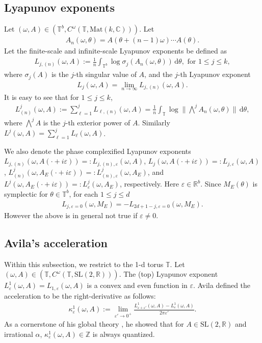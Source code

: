 \documentclass[11pt]{amsart}
\newcommand{\Z}{\mathbb Z}
\newcommand{\R}{\mathbb R}
\newcommand{\C}{\mathbb C}
\newcommand{\T}{\mathbb T}
\begin{document}
\subsection{Lyapunov exponents}
Let $(\omega, A)\in (\T^b, C^{\omega}(\T, \mathrm{Mat}(k,\C)))$. 
Let 
\begin{align}
A_n(\omega,\theta)=A(\theta+(n-1)\omega)\cdots A(\theta).
\end{align}
Let the finite-scale and infinite-scale Lyapunov exponents be defined as 
\begin{align}\label{def:LE}
L_{j,(n)}(\omega, A):=\frac{1}{n}\int_{\T^b} \log \sigma_j(A_n(\omega,\theta))\, \mathrm{d}\theta, \text{ for } 1\leq j\leq k,
\end{align}
where $\sigma_j(A)$ is the $j$-th singular value of $A$, and the $j$-th Lyapunov exponent
\begin{align}
L_j(\omega, A)=\lim_{n\to\infty}L_{j,(n)}(\omega, A).
\end{align}
It is easy to see that for $1\leq j\leq k$,
\begin{align}
L^j_{(n)}(\omega, A):=\sum_{\ell=1}^j L_{\ell,(n)}(\omega, A)=\frac{1}{n}\int_{\T}\log \|\textstyle{\bigwedge^j} A_n(\omega,\theta)\|\, \mathrm{d}\theta,
\end{align}
where $\textstyle{\bigwedge^j} A$ is the $j$-th exterior power of $A$. Similarly $L^j(\omega,A)=\sum_{\ell=1}^j L_{\ell}(\omega, A)$.

We also denote the phase complexified Lyapunov exponents $L_{j,(n)}(\omega,A(\cdot+i\varepsilon))=:L_{j,(n),\varepsilon}(\omega,A)$, $L_j(\omega,A(\cdot+i\varepsilon))=:L_{j,\varepsilon}(\omega,A)$, $L^j_{(n)}(\omega,A_E(\cdot+i\varepsilon))=:L^j_{(n),\varepsilon}(\omega,A_E)$, and $L^j(\omega,A_E(\cdot+i\varepsilon))=:L^j_{\varepsilon}(\omega,A_E)$, respectively. Here $\varepsilon\in \R^b$.
Since $M_E(\theta)$ is symplectic for $\theta\in \T^b$,   for each $1\leq j\leq d$  
\begin{align}
    L_{j,\varepsilon=0}(\omega,M_E)=-L_{2d+1-j,\varepsilon=0}(\omega,M_E).
\end{align}
However the above is in general not true if $\varepsilon\neq 0$.

\subsection{Avila's acceleration}
Within this subsection, we restrict to the 1-d torus $\T$.
Let $(\omega, A)\in (\T, C^{\omega}(\T, \mathrm{SL}(2, \R)))$.
The (top) Lyapunov exponent $L^1_{\varepsilon}(\omega,A)=L_{1,\varepsilon}(\omega, A)$ is a convex and even function in $\varepsilon$.
Avila defined the acceleration to be the right-derivative as follows:
\begin{align}
\kappa^1_{\varepsilon}(\omega, A):=\lim_{\varepsilon'\to 0^+} \frac{L^1_{\varepsilon+\varepsilon'}(\omega, A)-L^1_{\varepsilon}(\omega, A)}{2\pi \varepsilon'}.
\end{align}
As a cornerstone of his global theory \cite{Global}, he showed that for $A\in \mathrm{SL}(2,\R)$ and irrational $\alpha$, $\kappa_{\varepsilon}^1(\omega, A)\in \Z$ is always quantized. 
\end{document}
